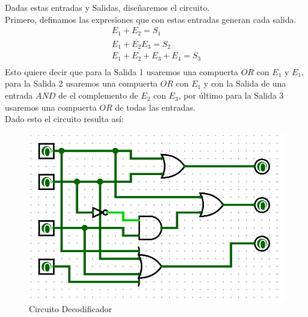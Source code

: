 Dadas estas entradas y Salidas, diseñaremos el circuito. \\
Primero, definamos las expresiones que con estas entradas generan cada salida. \\
\begin{align*}
E_{1}+E_{2}=S_{1} \\
E_{1} + \overline{E_{2}}E_{3} = S_{2} \\
E_{1} + E_{2} + E_{3} +E_{4} = S_{3} \\
\end{align*}
Esto quiere decir que para la Salida 1 usaremos una compuerta $OR$ con $E_{1}$ y $E_{1}$, para la Salida 2 usaremos una compuerta $OR$ con $E_{1}$ y con la Salida de una entrada $AND$ de el complemento de $E_{2}$ con $E_{3}$, por último para la Salida 3 usaremos una compuerta $OR$ de todas las entradas. \\
\newline
Dado esto el circuito resulta así: \\
\begin{figure}
    \centering
    \includegraphics[height = 0.30\textheight]{recursos/Ejercicio4/CircuitoDecodificador.png}\par
    \caption*{Circuito Decodificador}
\end{figure}
